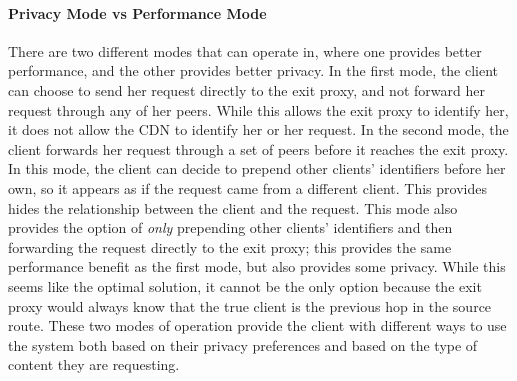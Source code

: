 \paragraph{Privacy Mode vs Performance Mode}
There are two different modes that \system{} can operate in, where one provides better 
performance, and the other provides better privacy.  In the first mode, the client can 
choose to send her request directly to the exit proxy, and not forward her request through 
any of her peers.  While this allows the exit proxy to identify her, it does not allow the 
CDN to identify her or her request.  In the second mode, the client forwards her request 
through a set of peers before it reaches the exit proxy.  In this mode, the client can decide 
to prepend other clients' identifiers before her own, so it appears as if the request came from 
a different client.  This provides hides the relationship between the client and the request.  This mode 
also provides the option of {\it only} prepending other clients' identifiers and then forwarding 
the request directly to the exit proxy; this provides the same performance benefit as the first 
mode, but also provides some privacy.  While this seems like the optimal solution, it cannot be 
the only option because the exit proxy would always know that the true client is the previous hop 
in the source route.  These two modes of operation provide the client with different ways to use 
the system both based on their privacy preferences and based on the type of content they are requesting.

